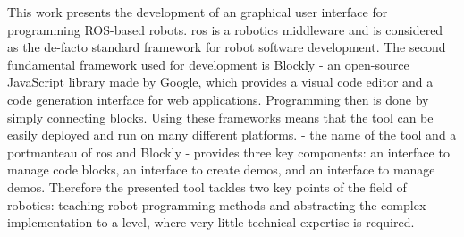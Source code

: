 
This work presents the development of an graphical user interface for programming ROS-based robots. \gls{ros} is a robotics middleware and is considered as the de-facto standard framework for robot software development. The second fundamental framework used for development is Blockly - an open-source JavaScript library made by Google, which provides a visual code editor and a code generation interface for web applications. Programming then is done by simply connecting blocks. Using these frameworks means that the tool can be easily deployed and run on many different platforms. \toolname{} - the name of the tool and a portmanteau of \gls{ros} and Blockly - provides three key components: an interface to manage code blocks, an interface to create demos, and an interface to manage demos. Therefore the presented tool tackles two key points of the field of robotics: teaching robot programming methods and abstracting the complex implementation to a level, where very little technical expertise is required.